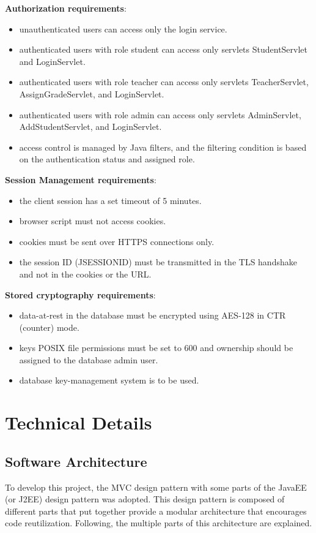\noindent\textbf{Authorization requirements}:
\begin{itemize}
    \item unauthenticated users can access only the login service.
    \item authenticated users with role student can access only servlets StudentServlet and LoginServlet.
    \item authenticated users with role teacher can access only servlets TeacherServlet, AssignGradeServlet, and LoginServlet.
    \item authenticated users with role admin can access only servlets AdminServlet, AddStudentServlet, and LoginServlet.
    \item access control is managed by Java filters, and the filtering condition is based on the authentication status and assigned role.
\end{itemize}

\noindent\textbf{Session Management requirements}:
\begin{itemize}
    \item the client session has a set timeout of 5 minutes.
    \item browser script must not access cookies.
    \item cookies must be sent over HTTPS connections only.
    \item the session ID (JSESSIONID) must be transmitted in the TLS handshake and not in the cookies or the URL.
\end{itemize}

\noindent\textbf{Stored cryptography requirements}:
\begin{itemize}
    \item data-at-rest in the database must be encrypted using AES-128 in CTR (counter) mode.
    \item keys POSIX file permissions must be set to 600 and ownership should be assigned to the database admin user.
    \item database key-management system is to be used.
\end{itemize}
\newpage
\chapter{Technical Details}

\section{Software Architecture}
To develop this project, the MVC design pattern with some parts of the JavaEE (or J2EE) design pattern was adopted. This design pattern is composed of different parts that put together provide a modular architecture that encourages code reutilization. Following, the multiple parts of this architecture are explained.

